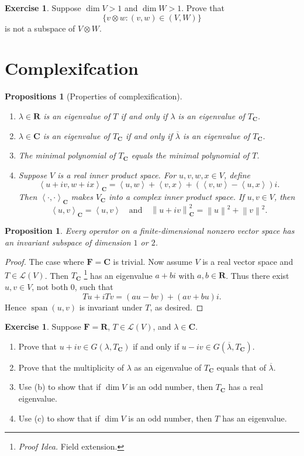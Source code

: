 \documentclass[nofonts,colorlinks]{tufte-handout}
\theoremstyle{plain} %
\newtheorem{prop}[thm]{Proposition}
\newtheorem{props}[thm]{Propositions}
\theoremstyle{definition}
\newtheorem{exer}[thm]{Exercise}
\theoremstyle{remark}
\def\idea{\textit{\color[rgb]{0,0,.55}Proof Idea. }}
\newcommand{\norm}[1]{\mathopen{}\left\lVert#1\right\rVert}
\newcommand{\inp}[2]{\mathopen{}\left\langle#1,#2\right\rangle}
\newcommand{\R}{\mathbf{R}}
\newcommand{\C}{\mathbf{C}}
\newcommand{\F}{\mathbf{F}}
\renewcommand{\L}{\mathcal{L}}
\DeclareMathOperator{\spn}{span}
\begin{document}
\begin{exer}
	Suppose $\dim V>1$ and $\dim W>1$. Prove that
	\[\{v\otimes w:(v,w)\in(V,W)\}\]
	is not a subspace of $V\otimes W$.
\end{exer}


\section{Complexifcation}
\begin{props}[Properties of complexification]
	\begin{enumerate}
		\item $\lambda\in\R$ is an eigenvalue of $T$ if and only if $\lambda$ is an eigenvalue of $T_{\C}$.
		\item $\lambda\in\C$ is an eigenvalue of $T_{\C}$ if and only if $\overline{\lambda}$ is an eigenvalue of $T_{\C}$.
		\item The minimal polynomial of $T_{\C}$ equals the minimal polynomial of $T$.
		\item Suppose $V$ is a real inner product space. For $u,v,w,x\in V$, define
		\[\inp{u+iv}{w+ix}_{\C}=\inp{u}{w}+\inp{v}{x}+(\inp{v}{w}-\inp{u}{x})i.\]
		Then $\inp{\cdot}{\cdot}_{\C}$ makes $V_{\C}$ into a complex inner product space. If $u,v\in V$, then
		\[\inp{u}{v}_{\C}=\inp{u}{v}\quad\text{and}\quad\norm{u+iv}_{\C}^2=\norm{u}^2+\norm{v}^2.\]
	\end{enumerate}
\end{props}

\begin{prop}
	Every operator on a finite-dimensional nonzero vector space has an invariant subspace of dimension $1$ or $2$.
\end{prop}
\begin{proof}
	The case where $\F=\C$ is trivial. Now assume $V$ is a real vector space and $T\in\L(V)$. Then $T_{\C}$%
	\footnote{\idea Field extension.}
	has an eigenvalue $a+bi$ with $a,b\in\R$. Thus there exist $u,v\in V$, not both $0$, such that
	\[Tu+iTv=(au-bv)+(av+bu)i.\]
	Hence $\spn(u,v)$ is invariant under $T$, as desired.
\end{proof}

\begin{exer}
	Suppose $\F=\R$, $T\in\L(V)$, and $\lambda\in\C$.
	\begin{enumerate}
		\item Prove that $u+iv\in G(\lambda,T_\C)$ if and only if $u-iv\in G(\overline{\lambda}, T_\C)$.
		\item Prove that the multiplicity of $\lambda$ as an eigenvalue of $T_\C$ equals that of $\overline{\lambda}$.
		\item Use (b) to show that if $\dim V$ is an odd number, then $T_\C$ has a real eigenvalue.
		\item Use (c) to show that if $\dim V$ is an odd number, then $T$ has an eigenvalue.
	\end{enumerate}
\end{exer}
\end{document}

